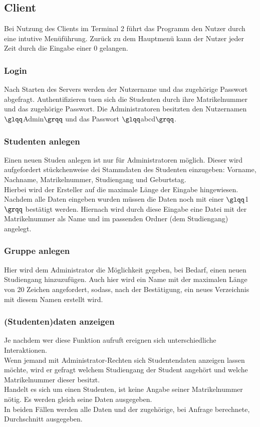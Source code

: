 \documentclass{scrartcl}
\begin{document}
	\subsection{Client}
		Bei Nutzung des Clients im Terminal 2 führt das Programm den Nutzer durch eine intutive Menüführung. Zurück zu dem Hauptmenü kann der Nutzer jeder Zeit durch die Eingabe einer 0 gelangen.
		\subsubsection{Login}
			Nach Starten des Servers werden der Nutzername und das zugehörige Passwort abgefragt. Authentifizieren tuen sich die Studenten durch ihre Matrikelnummer und das zugehörige Passwort. 
			Die Administratoren besitzten den Nutzernamen $\glqq$Admin$\grqq$ und das Passwort $\glqq$abcd$\grqq$.
		\subsubsection{Studenten anlegen}
			Einen neuen Studen anlegen ist nur für Administratoren möglich. Dieser wird aufgefordert stückchenweise dei Stammdaten des Studenten einzugeben: Vorname, Nachname, Matrikelnummer, Studiengang und Geburtstag.\\
			Hierbei wird der Ersteller auf die maximale Länge der Eingabe hingewiesen. Nachdem alle Daten eingeben wurden müssen die Daten noch mit einer $\glqq$1$\grqq$ bestätigt werden. Hiernach wird durch diese Eingabe  eine Datei mit der Matrikelnummer als Name und im passenden Ordner (dem Studiengang) angelegt.
		\subsubsection{Gruppe anlegen}
			Hier wird dem Administrator die Möglichkeit gegeben, bei Bedarf, einen neuen Studiengang hinzuzufügen. Auch hier wird ein Name mit der maximalen Länge von 20 Zeichen angefordert, sodass, nach der Bestätigung, ein neues Verzeichnis mit diesem Namen erstellt wird.
		\subsubsection{(Studenten)daten anzeigen}
			Je nachdem wer diese Funktion aufruft ereignen sich unterschiedliche Interaktionen. \\
			Wenn jemand mit Administrator-Rechten sich Studentendaten anzeigen lassen möchte, wird er gefragt welchem Studiengang der Student angehört und welche Matrikelnummer dieser besitzt.\\
			Handelt es sich um einen Studenten, ist keine Angabe seiner Matrikelnummer nötig. Es werden gleich seine Daten ausgegeben.\\
			In beiden Fällen werden alle Daten und der zugehörige, bei Anfrage berechnete, Durchschnitt ausgegeben.
\end{document}
